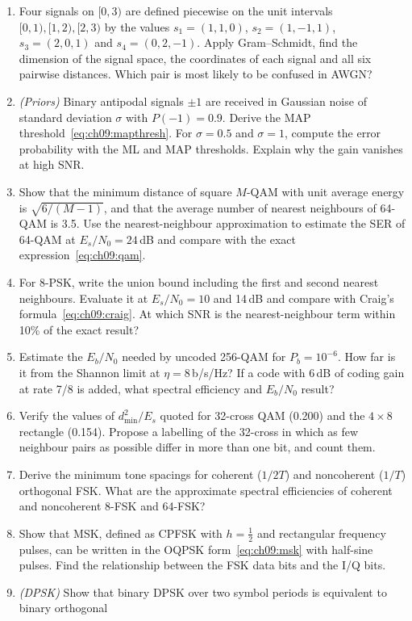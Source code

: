 \problems
\begin{enumerate}[label=\thechapter.\arabic*]
\item Four signals on $[0,3)$ are defined piecewise on the unit intervals $[0,1),[1,2),[2,3)$ by the
values $s_1=(1,1,0)$, $s_2=(1,-1,1)$, $s_3=(2,0,1)$ and $s_4=(0,2,-1)$. Apply Gram--Schmidt, find the
dimension of the signal space, the coordinates of each signal and all six pairwise distances.
Which pair is most likely to be confused in AWGN?
\item \emph{(Priors)} Binary antipodal signals $\pm1$ are received in Gaussian noise of standard
deviation $\sigma$ with $P(-1)=0.9$. Derive the MAP threshold~\eqref{eq:ch09:mapthresh}. For
$\sigma=0.5$ and $\sigma=1$, compute the error probability with the ML and MAP thresholds. Explain
why the gain vanishes at high SNR.
\item Show that the minimum distance of square $M$-QAM with unit average energy is
$\sqrt{6/(M-1)}$, and that the average number of nearest neighbours of 64-QAM is 3.5. Use the
nearest-neighbour approximation to estimate the SER of 64-QAM at $E_s/N_0=24$\,dB and compare with
the exact expression~\eqref{eq:ch09:qam}.
\item For 8-PSK, write the union bound including the first and second nearest neighbours. Evaluate
it at $E_s/N_0=10$ and 14\,dB and compare with Craig's formula~\eqref{eq:ch09:craig}. At which SNR is
the nearest-neighbour term within 10\% of the exact result?
\item Estimate the $E_b/N_0$ needed by uncoded 256-QAM for $P_b=10^{-6}$. How far is it from the
Shannon limit at $\eta=8$\,b/s/Hz? If a code with 6\,dB of coding gain at rate 7/8 is added, what
spectral efficiency and $E_b/N_0$ result?
\item Verify the values of $d_{\min}^2/E_s$ quoted for 32-cross QAM (0.200) and the $4\times8$
rectangle (0.154). Propose a labelling of the 32-cross in which as few neighbour pairs as possible
differ in more than one bit, and count them.
\item Derive the minimum tone spacings for coherent ($1/2T$) and noncoherent ($1/T$) orthogonal FSK.
What are the approximate spectral efficiencies of coherent and noncoherent 8-FSK and 64-FSK?
\item Show that MSK, defined as CPFSK with $h=\tfrac12$ and rectangular frequency pulses, can be
written in the OQPSK form~\eqref{eq:ch09:msk} with half-sine pulses. Find the relationship between
the FSK data bits and the I/Q bits.
\item \emph{(DPSK)} Show that binary DPSK over two symbol periods is equivalent to binary orthogonal

\end{enumerate}

